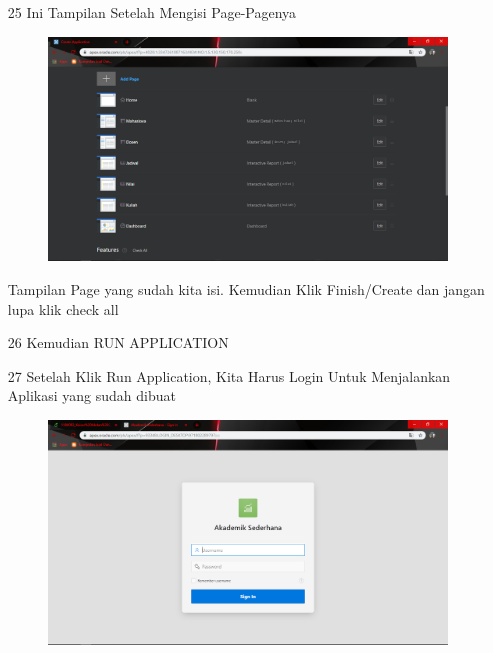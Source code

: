 \begin{enumerate}
\newpage
\item[25]Ini Tampilan Setelah Mengisi Page-Pagenya

\begin{figure}[!htbp]
    \begin{center}
    \includegraphics[scale=0.3]{figures/36.png}
    \end{center}   
    \end{figure}
    
\par
Tampilan Page yang sudah kita isi. Kemudian Klik Finish/Create dan jangan lupa klik check all 

\item[26]Kemudian RUN APPLICATION

\item[27]Setelah Klik Run Application, Kita Harus Login Untuk Menjalankan Aplikasi yang sudah dibuat

\begin{figure}[!htbp]
    \begin{center}
    \includegraphics[scale=0.3]{figures/43.png}
    \end{center}   
    \end{figure}
    

\end{enumerate}
